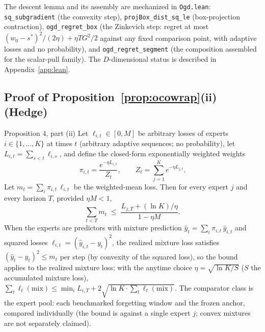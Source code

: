 \begin{remark}
The descent lemma and its assembly are mechanized in \texttt{Ogd.lean}:
\texttt{sq\_subgradient} (the convexity step),
\texttt{projBox\_dist\_sq\_le} (box-projection contraction),
\texttt{ogd\_regret\_box} (the Zinkevich step: regret at most $(w_0 - s^*)^2/(2\eta) + \eta T G^2/2$ against any fixed comparison point, with adaptive losses and no probability),
and \texttt{ogd\_regret\_segment} (the composition assembled for the scalar-pull family).
The $D$-dimensional status is described in Appendix~\ref{app:lean}.
\end{remark}

\subsection{Proof of Proposition~\ref{prop:ocowrap}(ii) (Hedge)}
\label{app:proof-hedge}

\begin{restated}{Proposition 4, part (ii)}
Let $\ell_{i,t} \in [0, M]$ be arbitrary losses of experts $i \in \{1, \dots, K\}$ at times $t$ (arbitrary adaptive sequences; no probability), let $L_{i,t} = \sum_{s < t} \ell_{i,s}$, and define the closed-form exponentially weighted weights
\[
  \pi_{i,t} = \frac{e^{-\eta L_{i,t}}}{Z_t},
  \qquad
  Z_t = \sum_{j=1}^K e^{-\eta L_{j,t}} .
\]
Let $m_t = \sum_i \pi_{i,t}\,\ell_{i,t}$ be the weighted-mean loss.
Then for every expert $j$ and every horizon $T$, provided $\eta M < 1$,
\[
  \sum_{t < T} m_t \;\le\; \frac{L_{j,T} + (\ln K)/\eta}{1 - \eta M}.
\]
When the experts are predictors with mixture prediction $\widehat y_t = \sum_i \pi_{i,t}\,\widehat y_{i,t}$ and squared losses $\ell_{i,t} = (\widehat y_{i,t} - y_t)^2$, the realized mixture loss satisfies $(\widehat y_t - y_t)^2 \le m_t$ per step (by convexity of the squared loss), so the bound applies to the realized mixture loss; with the anytime choice $\eta = \sqrt{\ln K / S}$ ($S$ the accumulated mixture loss), $\sum_t \ell_t(\mathrm{mix}) \le \min_i L_{i,T} + 2\sqrt{\ln K \cdot \sum_t \ell_t(\mathrm{mix})}$.
The comparator class is the expert pool: each benchmarked forgetting window and the frozen anchor, compared individually (the bound is against a single expert $j$; convex mixtures are not separately claimed).
\end{restated}


